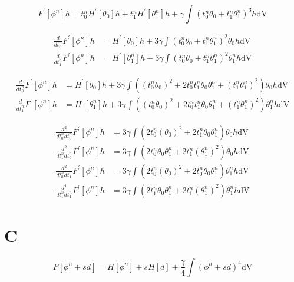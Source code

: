 \documentclass[12pt,a4paper]{article}
\newcommand{\dV}{\ensuremath{\mathrm{dV}}}
\begin{document}
\begin{equation}
F^\prime\left[\phi^n\right] h = t^n_0 H^\prime\left[\theta_0\right] h + t^n_1 H^\prime\left[\theta^n_1\right] h + \gamma \int \left(t^n_0 \theta_0 + t^n_1 \theta^n_1\right)^3 h \dV
\end{equation}

\begin{align}
\frac{d}{d t^n_0} F^\prime\left[\phi^n\right] h &= H^\prime\left[\theta_0\right] h + 3\gamma \int\left(t^n_0 \theta_0 + t^n_1 \theta^n_1\right)^2 \theta_0 h \dV  \\
\frac{d}{d t^n_1} F^\prime\left[\phi^n\right] h &= H^\prime\left[\theta^n_1\right] h + 3\gamma \int\left(t^n_0 \theta_0 + t^n_1 \theta^n_1\right)^2 \theta^n_1 h \dV
\end{align}

\begin{align}
\frac{d}{d t^n_0} F^\prime\left[\phi^n\right] h &= H^\prime\left[\theta_0\right] h + 3\gamma \int \left((t^n_0 \theta_0)^2 + 2 t^n_0 t^n_1 \theta_0 \theta^n_1 + (t^n_1 \theta^n_1)^2 \right) \theta_0 h \dV  \\
\frac{d}{d t^n_1} F^\prime\left[\phi^n\right] h &= H^\prime\left[\theta^n_1\right] h + 3\gamma \int \left((t^n_0 \theta_0)^2 + 2 t^n_0 t^n_1 \theta_0 \theta^n_1 + (t^n_1 \theta^n_1)^2 \right) \theta^n_1 h \dV
\end{align}

\begin{align}
\frac{d^2}{d t^n_0 d t^n_0} F^\prime\left[\phi^n\right] h &= 3\gamma \int \left(2 t^n_0 (\theta_0)^2 + 2 t^n_1 \theta_0 \theta^n_1 \right) \theta_0 h \dV  \\
\frac{d^2}{d t^n_1 d t^n_0 } F^\prime\left[\phi^n\right] h &= 3\gamma \int \left(2 t^n_0 \theta_0 \theta^n_1 + 2 t^n_1 (\theta^n_1)^2 \right) \theta_0 h \dV  \\
\frac{d^2}{d t^n_0 d t^n_1} F^\prime\left[\phi^n\right] h &= 3\gamma \int \left(2 t^n_0 (\theta_0)^2 + 2 t^n_0 \theta_0 \theta^n_1 \right) \theta^n_1 h \dV \\
\frac{d^1}{d t^n_1 d t^n_1} F^\prime\left[\phi^n\right] h &= 3\gamma \int \left(2 t^n_1 \theta_0 \theta^n_1 + 2 t^n_1 (\theta^n_1)^2  \right) \theta^n_1 h \dV
\end{align}

\section{C}

\begin{equation}
F\left[\phi^n+sd\right] = H\left[\phi^n\right] + s H\left[d\right] + \frac{\gamma}{4} \int \left(\phi^n+sd\right)^4 \dV
\end{equation}
\end{document}
